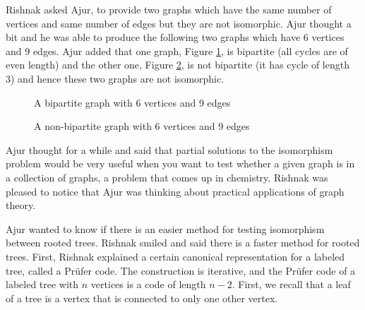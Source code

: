 Rishnak asked Ajur, to provide two graphs which have the same number of vertices and same number of edges but they are not isomorphic. Ajur thought a bit and he was able to produce the following two graphs which have 6 vertices and 9 edges. Ajur added that one graph, Figure \ref{8g3}, is bipartite (all cycles are of even length)  and the other one, Figure \ref{8g4}, is not bipartite (it has cycle of length 3) and hence these two graphs are not isomorphic.
\begin{figure}
\begin{center}
\caption{ A bipartite graph with 6 vertices and 9 edges}\label{8g3}
\end{center}
\end{figure}

\begin{figure}
\begin{center}
\caption{ A non-bipartite graph with 6 vertices and 9 edges}\label{8g4}
\end{center}
\end{figure}

Ajur thought for a while and said that partial solutions to the isomorphism problem would be very useful when you want to test whether a given graph is in a collection of graphs, a problem that comes up in chemistry. Rishnak was pleased to notice that Ajur was thinking about practical applications of graph theory. 

Ajur wanted to know if there is an easier method for testing isomorphism between rooted trees. Rishnak smiled and said there is a faster method for rooted trees. First, Rishnak explained a certain canonical representation for a labeled tree, called a Pr\"ufer code. The construction is iterative, and the Pr\"ufer code of a labeled tree with $n$ vertices is a code of length $n-2$. First, we recall that a leaf of a tree is a vertex that is connected to only one other vertex.

